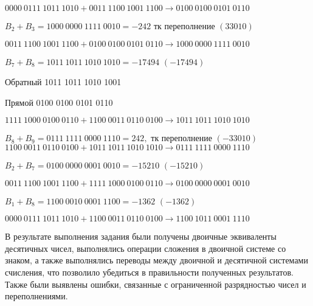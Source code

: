 \documentclass{article}
\begin{document}
$0000\:0111\:1011\:1010 + 0011\:1100\:1001\:1100 \rightarrow 0100\:0100\:0101\:0110$

$B_2 + B_3 = 1000\:0000\:1111\:0010 = -242$ тк переполнение $(33010)$

$0011\:1100\:1001\:1100 + 0100\:0100\:0101\:0110 \rightarrow 1000\:0000\:1111\:0010$

$B_7 + B_8 = 1011\:1011\:1010\:1010 = -17494$ $(-17494)$

Обратный 1011 1011 1010 1001

Прямой 0100 0100 0101 0110

$1111\:1000\:0100\:0110 + 1100\:0011\:0110\:0100 \rightarrow 1011\:1011\:1010\:1010$

$B_8 + B_9 = 0111\:1111\:0000\:1110 = 242,$ тк переполнение $(-33010)$
$1100\:0011\:0110\:0100 + 1011\:1011\:1010\:1010 \rightarrow 0111\:1111\:0000\:1110$

$B_2 + B_7 = 0100\:0000\:0001\:0010 = -15210$ $(-15210)$

$0011\:1100\:1001\:1100 + 1111\:1000\:0100\:0110 \rightarrow 0100\:0000\:0001\:0010$

$B_1 + B_8 = 1100\:0010\:0001\:1100 = -1362$ $(-1362)$

$0000\:0111\:1011\:1010 + 1100\:0011\:0110\:0100 \rightarrow 1100\:1011\:0001\:1110$

В результате выполнения задания были получены двоичные эквиваленты десятичных чисел, выполнялись операции сложения в двоичной системе со знаком, а также выполнялись переводы между двоичной и десятичной системами счисления, что позволило убедиться в правильности полученных результатов. Также были выявлены ошибки, связанные с ограниченной разрядностью чисел и переполнениями.
\end{document}
